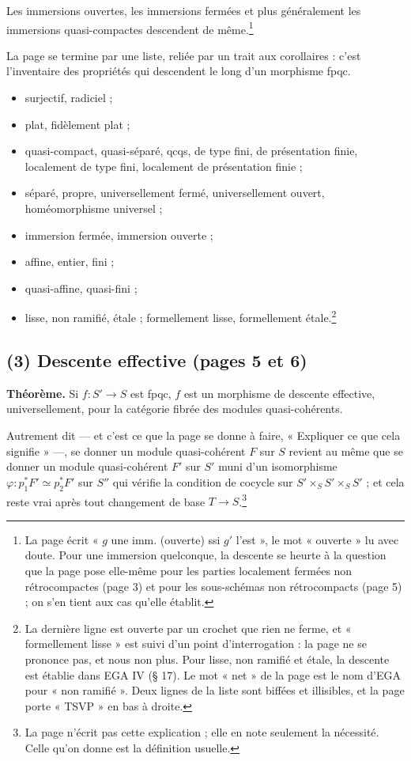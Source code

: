 \documentclass[11pt,a4paper]{article}
\begin{document}
Les immersions ouvertes, les immersions fermées et plus généralement les
immersions quasi-compactes descendent de même.\footnote{La page écrit
« $g$ une imm. (ouverte) ssi $g'$ l'est », le mot « ouverte » lu avec doute.
Pour une immersion quelconque, la descente se heurte à la question que la page
pose elle-même pour les parties localement fermées non rétrocompactes (page 3)
et pour les sous-schémas non rétrocompacts (page 5) ; on s'en tient aux cas
qu'elle établit.}

La page se termine par une liste, reliée par un trait aux corollaires : c'est
l'inventaire des propriétés qui descendent le long d'un morphisme fpqc.

\begin{itemize}
  \item surjectif, radiciel ;
  \item plat, fidèlement plat ;
  \item quasi-compact, quasi-séparé, qcqs, de type fini, de présentation
  finie, localement de type fini, localement de présentation finie ;
  \item séparé, propre, universellement fermé, universellement ouvert,
  homéomorphisme universel ;
  \item immersion fermée, immersion ouverte ;
  \item affine, entier, fini ;
  \item quasi-affine, quasi-fini ;
  \item lisse, non ramifié, étale ; formellement lisse, formellement
  étale.\footnote{La dernière ligne est ouverte par un crochet que rien ne
  ferme, et « formellement lisse » est suivi d'un point d'interrogation : la
  page ne se prononce pas, et nous non plus. Pour lisse, non ramifié et étale,
  la descente est établie dans EGA IV (§ 17). Le mot « net » de la page est le
  nom d'EGA pour « non ramifié ». Deux lignes de la liste sont biffées et
  illisibles, et la page porte « TSVP » en bas à droite.}
\end{itemize}

\subsection*{(3) Descente effective (pages 5 et 6)}

\textbf{Théorème.} Si $f : S' \to S$ est fpqc, $f$ est un morphisme de
descente effective, universellement, pour la catégorie fibrée des modules
quasi-cohérents.

Autrement dit --- et c'est ce que la page se donne à faire, « Expliquer ce que
cela signifie » ---, se donner un module quasi-cohérent $F$ sur $S$ revient au
même que se donner un module quasi-cohérent $F'$ sur $S'$ muni d'un isomorphisme
$\varphi : p_1^* F' \simeq p_2^* F'$ sur $S''$ qui vérifie la condition de
cocycle sur $S' \times_S S' \times_S S'$ ; et cela reste vrai après tout
changement de base $T \to S$.\footnote{La page n'écrit pas cette explication ; elle
en note seulement la nécessité. Celle qu'on donne est la définition usuelle.}
\end{document}

